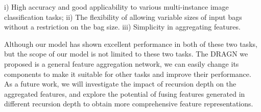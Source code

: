 \documentclass[10pt,twocolumn,letterpaper]{article}
\begin{document}
i) High accuracy and good applicability to various multi-instance image classification tasks;
ii) The flexibility of allowing variable sizes of input bags without a restriction on the bag size.
iii) Simplicity in aggregating features.

Although our model has shown excellent performance in both of these two tasks, but the scope of our model is not limited to these two tasks. The DRAGN we proposed is a general feature aggregation network, we can easily change its components to make it suitable for other tasks and improve their performance. As a future work, we will investigate the impact of recursion depth on the aggregated features, and explore the potential of fusing features generated in different recursion depth to obtain more comprehensive feature representations.


%

{\small
%


}
\end{document}
